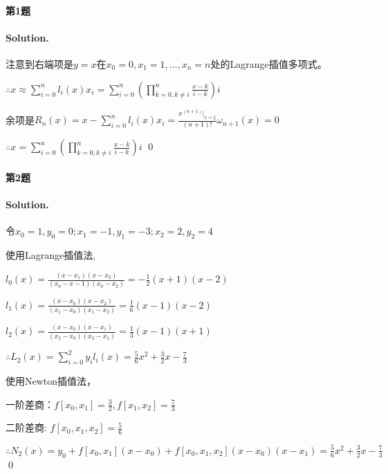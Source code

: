 \documentclass[a4paper]{article}
\newenvironment{solution}
{\color{blue} \paragraph{Solution.}}
{\newline \qed}
\begin{document}
	\paragraph{第1题}
\begin{solution}
  注意到右端项是$y=x$在$x_0=0, x_1=1, ...,x_n=n$处的Lagrange插值多项式。
  
  $\therefore x \approx \sum \limits_{i=0}^{n} l_i(x)x_i = \sum\limits_{i=0}^{n}(\prod\limits_{k=0,k\neq i}^{n}\frac{x-k}{i-k})i$

  余项是$R_n(x) =x - \sum \limits_{i=0}^{n} l_i(x)x_i= \frac{x^{(n+1)}|_{x=\xi}}{(n+1)!}\omega_{n+1}(x)=0$
  
  $\therefore x=\sum\limits_{i=0}^{n}(\prod\limits_{k=0,k\neq i}^{n}\frac{x-k}{i-k})i$
\end{solution}

	\paragraph{第2题}
\begin{solution}
	令$x_0=1,y_0=0;x_1=-1,y_1=-3;x_2=2,y_2=4$
	
	使用Lagrange插值法,
	
	$l_0(x) = \frac{(x-x_1)(x-x_2)}{(x_0-x-1)(x_0-x_2)}=-\frac{1}{2}(x+1)(x-2)$
	
	$l_1(x) = \frac{(x-x_0)(x-x_2)}{(x_1-x_0)(x_1-x_2)}=\frac{1}{6}(x-1)(x-2)$
	
	$l_2(x) = \frac{(x-x_0)(x-x_1)}{(x_2-x_0)(x_2-x_1)}=\frac{1}{3}(x-1)(x+1)$
	
	$\therefore L_2(x)=\sum\limits_{i=0}^{2}y_il_i(x) = \frac{5}{6}x^{2}+\frac{3}{2}x-\frac{7}{3}$
	
	使用Newton插值法，
	
	一阶差商：$f[x_0,x_1]=\frac{3}{2}, f[x_1,x_2]=\frac{7}{3}$
	
	二阶差商: $f[x_0, x_1, x_2] = \frac{5}{6}$
	
	$\therefore N_2(x) = y_0 + f[x_0, x_1](x-x_0) + f[x_0, x_1, x_2](x-x_0)(x-x_1) = \frac{5}{6}x^{2}+\frac{3}{2}x-\frac{7}{3}$
\end{solution}
\end{document}
